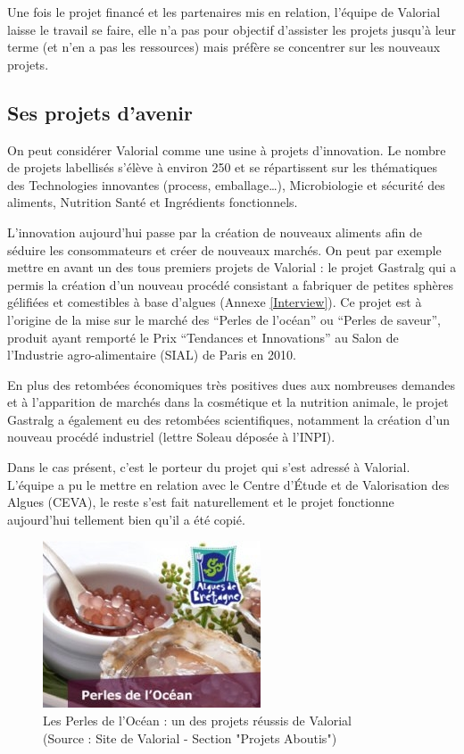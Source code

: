 \documentclass[a4paper,12pt]{report}
\begin{document}
    			Une fois le projet financé et les partenaires mis en relation, l’équipe de Valorial laisse le travail se faire, elle n’a pas pour objectif d’assister les projets jusqu’à leur terme (et n’en a pas les ressources) mais préfère se concentrer sur les nouveaux projets.
				
		\subsection{Ses projets d'avenir}
				On peut considérer Valorial comme une usine à projets d’innovation. Le nombre de projets labellisés s’élève à environ 250 et se répartissent sur les thématiques des Technologies innovantes (process, emballage…), Microbiologie et sécurité des aliments, Nutrition Santé et Ingrédients fonctionnels\cite{ProjetsAboutis}.

   				L’innovation aujourd’hui passe par la création de nouveaux aliments afin de séduire les consommateurs et créer de nouveaux marchés. On peut par exemple mettre en avant un des tous premiers projets de Valorial : le projet Gastralg qui a permis la création d’un nouveau procédé consistant a fabriquer de petites sphères gélifiées et comestibles à base d’algues (Annexe \ref{Interview}). Ce projet est à l’origine de la mise sur le marché des  “Perles de l’océan” ou “Perles de saveur”, produit ayant remporté le Prix “Tendances et Innovations” au Salon de l’Industrie agro-alimentaire (SIAL) de Paris en 2010.
    
				En plus des retombées économiques très positives dues aux nombreuses demandes et à l’apparition de marchés dans la cosmétique et la nutrition animale, le projet Gastralg a également eu des retombées scientifiques, notamment la création d’un nouveau procédé industriel (lettre Soleau déposée à l’INPI).

	Dans le cas présent, c’est le porteur du projet qui s’est adressé à Valorial. L’équipe a pu le mettre en relation avec le Centre d’Étude et de Valorisation des Algues (CEVA), le reste s’est fait naturellement et le projet fonctionne aujourd’hui tellement bien qu’il a été copié.

\begin{figure}[!h]
			\centering
			\includegraphics[scale=0.5]{Illustrations/PerlesOcean.jpg}
			\caption{Les Perles de l'Océan : un des projets réussis de Valorial\\(Source : Site de Valorial - Section "Projets Aboutis"\cite{ProjetsAboutis})}
			\label{PerlesOcean}
			\end{figure}
\end{document}
